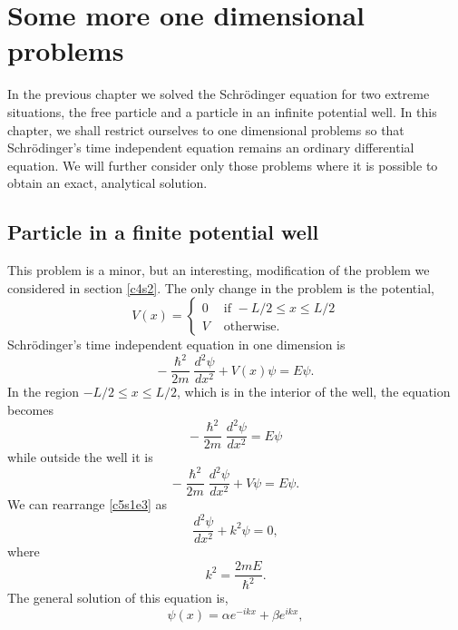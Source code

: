 \chapter{Some more one dimensional problems}\label{c5}
In the previous chapter we solved the Schr\"{o}dinger equation for two extreme
situations, the free particle and a particle in an infinite potential well. In
this chapter, we shall restrict ourselves to one dimensional problems so that
Schr\"{o}dinger's time independent equation remains an ordinary differential
equation. We will further consider only those problems where it is possible to
obtain an exact, analytical solution.

\section{Particle in a finite potential well}\label{c5s1}
This problem is a minor, but an interesting, modification of the problem we
considered in section \ref{c4s2}. The only change in the problem is the 
potential,
\begin{equation}\label{c5s1e1}
V(x) = \begin{cases}
0 & \text{ if } -L/2 \le x \le L/2 \\
V & \text{ otherwise.}
\end{cases}
\end{equation}
Schr\"{o}dinger's time independent equation in one dimension is
\begin{equation}\label{c5s1e2}
-\frac{\hslash^2}{2m}\frac{d^2\psi}{dx^2} + V(x)\psi = E\psi.
\end{equation}
In the region $-L/2 \le x \le L/2$, which is in the interior of the well,
the equation becomes
\begin{equation}\label{c5s1e3}
-\frac{\hslash^2}{2m}\frac{d^2\psi}{dx^2} = E\psi
\end{equation}
while outside the well it is
\begin{equation}\label{c5s1e4}
-\frac{\hslash^2}{2m}\frac{d^2\psi}{dx^2} + V\psi = E\psi.
\end{equation}
We can rearrange \eqref{c5s1e3} as
\begin{equation}\label{c5s1e5}
\frac{d^2\psi}{dx^2} + k^2\psi = 0,
\end{equation}
where
\begin{equation}\label{c5s1e6}
k^2 = \frac{2mE}{\hslash^2}.
\end{equation}
The general solution of this equation is, 
\begin{equation}\label{c5s1e7}
\psi(x) = \alpha e^{-ikx} + \beta e^{ikx},
\end{equation}
